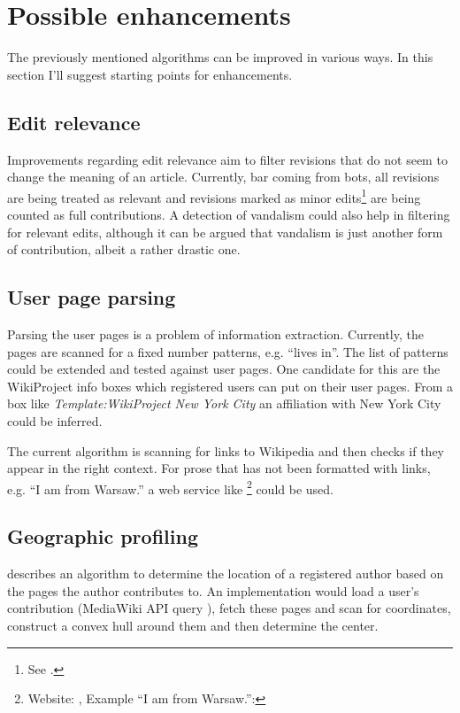 \section{Possible enhancements}

The previously mentioned algorithms can be improved in various ways.
In this section I'll suggest starting points for enhancements.

\subsection{Edit relevance}

Improvements regarding edit relevance aim to filter revisions that do not seem to change the meaning of an article.
Currently, bar coming from bots, all revisions are being treated as relevant and revisions marked as minor edits\footnote{See .} are being counted as full contributions.
A detection of vandalism could also help in filtering for relevant edits, although it can be argued that vandalism is just another form of contribution, albeit a rather drastic one.

\subsection{User page parsing}

Parsing the user pages is a problem of information extraction.
Currently, the pages are scanned for a fixed number patterns, e.g. ``lives in''.
The list of patterns could be extended and tested against user pages.
One candidate for this are the WikiProject info boxes which registered users can put on their user pages.
From a box like \emph{Template:WikiProject New York City} an affiliation with New York City could be inferred.

The current algorithm is scanning for links to Wikipedia and then checks if they appear in the right context.
For prose that has not been formatted with links, e.g. ``I am from Warsaw.'' a web service like \footnote{Website: , Example ``I am from Warsaw.'': } could be used.

\subsection{Geographic profiling}

\textcite{lieberman2009you} describes an algorithm to determine the location of a registered author based on the pages the author contributes to.
An implementation would load a user's contribution (MediaWiki API query ), fetch these pages and scan for coordinates, construct a convex hull around them and then determine the center.
